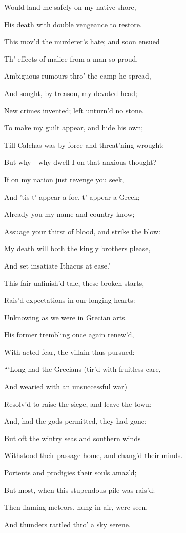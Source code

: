 Would land me safely on my native shore,

His death with double vengeance to restore.

This mov’d the murderer’s hate; and soon ensued

Th’ effects of malice from a man so proud.

Ambiguous rumours thro’ the camp he spread,

And sought, by treason, my devoted head;

New crimes invented; left unturn’d no stone,

To make my guilt appear, and hide his own;

Till Calchas was by force and threat’ning wrought:

But why—why dwell I on that anxious thought?

If on my nation just revenge you seek,

And ’tis t’ appear a foe, t’ appear a Greek;

Already you my name and country know;

Assuage your thirst of blood, and strike the blow:

My death will both the kingly brothers please,

And set insatiate Ithacus at ease.’

This fair unfinish’d tale, these broken starts,

Rais’d expectations in our longing hearts:

Unknowing as we were in Grecian arts.

His former trembling once again renew’d,

With acted fear, the villain thus pursued:

“‘Long had the Grecians (tir’d with fruitless care,

And wearied with an unsuccessful war)

Resolv’d to raise the siege, and leave the town;

And, had the gods permitted, they had gone;

But oft the wintry seas and southern winds

Withstood their passage home, and chang’d their minds.

Portents and prodigies their souls amaz’d;

But most, when this stupendous pile was rais’d:

Then flaming meteors, hung in air, were seen,

And thunders rattled thro’ a sky serene.

